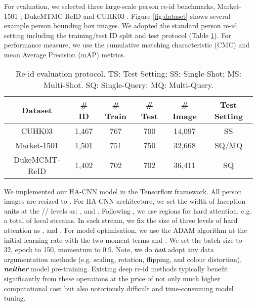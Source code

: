 \documentclass[10pt,twocolumn,letterpaper]{article}
\begin{document}
For evaluation, we selected three large-scale person re-id benchmarks, Market-1501 \cite{wang2016highly}, DukeMTMC-ReID \cite{zheng2017unlabeled} and CUHK03
\cite{li2014deepreid}.
Figure \ref{fig:dataset} shows several example person bounding box images. We adopted the standard person re-id setting
including the training/test ID split and test protocol
(Table \ref{tab:dataset_stats}).
For performance measure, we use
the cumulative matching characteristic (CMC) and mean Average Precision (mAP)
metrics.
\begin{table}[h!] \centering
\renewcommand{\arraystretch}{1.2}
	\setlength{\tabcolsep}{0.003cm}
\caption{Re-id evaluation protocol.
TS: Test Setting;
		SS: Single-Shot; MS: Multi-Shot.
		SQ: Single-Query; MQ: Multi-Query.
	}
\begin{tabular}{|c||c|c|c|c||c|}
		\hline 
		Dataset  & 
{\# ID} & 
		{\# Train } & 
		{\# Test} &
		{\# Image} & 
		Test Setting \\ \hline \hline CUHK03 & 1,467 & 767 & 700 & 14,097  & SS\\
		Market-1501 & 1,501& 751 & 750  & 32,668 & SQ/MQ \\
		DukeMCMT-ReID & 1,402& 702 & 702 & 36,411 & SQ \\
		\hline
	\end{tabular}\label{tab:dataset_stats}
	\vspace{-0.3cm}
\end{table}


We implemented our HA-CNN model in the Tensorflow \cite{abadi2016tensorflow} framework. 
All person images are resized to . 
For HA-CNN architecture, we set the width of Inception units 
at the // levels as:
,   and .
Following \cite{li2017person}, we use  regions for hard attention,
e.g. a total of  local streams. In each stream, we fix the size of three levels of hard attention as ,  and .
For model optimisation,
we use the ADAM \cite{kingma2014adam} algorithm  
at the initial learning rate  with the two moment terms 
 and .
We set the batch size to 32,
epoch to 150,
momentum to 0.9.
Note, we do {\bf \em not} adopt any data argumentation methods 
(e.g. scaling, rotation, flipping, and colour distortion),
{\bf \em neither} model pre-training.
Existing deep re-id methods typically benefit significantly from these operations
at the price of not only much higher computational cost but also
notoriously difficult and time-consuming model tuning.
\end{document}
